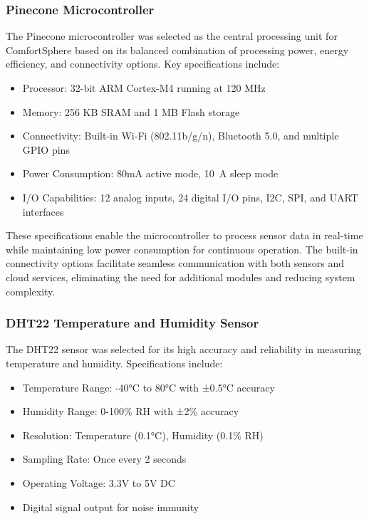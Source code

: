 \documentclass[a4paper]{scrartcl}
\begin{document}
    \subsubsection{Pinecone Microcontroller}
    The Pinecone microcontroller was selected as the central processing unit for ComfortSphere based on its balanced combination of processing power, energy efficiency, and connectivity options. Key specifications include:
\begin{itemize}
    \item Processor: 32-bit ARM Cortex-M4 running at 120 MHz
    \item Memory: 256 KB SRAM and 1 MB Flash storage
    \item Connectivity: Built-in Wi-Fi (802.11b/g/n), Bluetooth 5.0, and multiple GPIO pins
    \item Power Consumption: 80mA active mode, 10~\textmu A sleep mode
    \item I/O Capabilities: 12 analog inputs, 24 digital I/O pins, I2C, SPI, and UART interfaces
\end{itemize}

    
    These specifications enable the microcontroller to process sensor data in real-time while maintaining low power consumption for continuous operation. The built-in connectivity options facilitate seamless communication with both sensors and cloud services, eliminating the need for additional modules and reducing system complexity.
    
    \subsubsection{DHT22 Temperature and Humidity Sensor}
    The DHT22 sensor was selected for its high accuracy and reliability in measuring temperature and humidity. Specifications include:
    \begin{itemize}
        \item Temperature Range: -40°C to 80°C with ±0.5°C accuracy
        \item Humidity Range: 0-100\% RH with ±2\% accuracy
        \item Resolution: Temperature (0.1°C), Humidity (0.1\% RH)
        \item Sampling Rate: Once every 2 seconds
        \item Operating Voltage: 3.3V to 5V DC
        \item Digital signal output for noise immunity
    \end{itemize}
    
\end{document}
